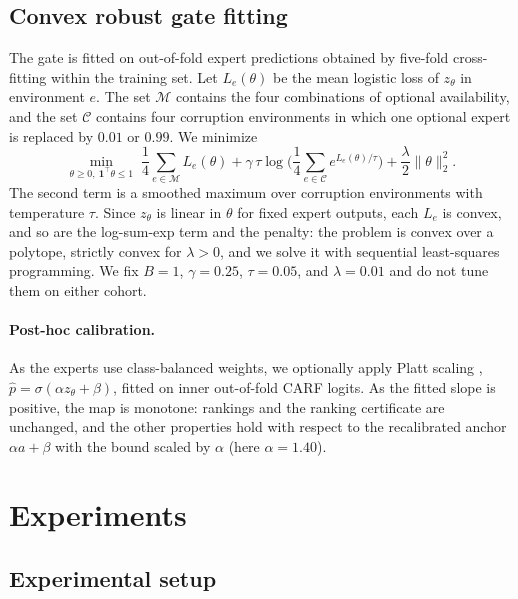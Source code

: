 \documentclass[runningheads]{llncs}
\providecommand{\PlattAlpha}{1.40}
\begin{document}
\subsection{Convex robust gate fitting}

The gate is fitted on out-of-fold expert predictions obtained by five-fold cross-fitting within the training set. Let $L_e(\theta)$ be the mean logistic loss of $z_\theta$ in environment $e$. The set $\mathcal M$ contains the four combinations of optional availability, and the set $\mathcal C$ contains four corruption environments in which one optional expert is replaced by $0.01$ or $0.99$. We minimize
\begin{equation}
 \min_{\theta\ge0,\ \mathbf 1^\top\theta\le1}\;
 \frac14\sum_{e\in\mathcal M}L_e(\theta)
 +\gamma\,\tau\log\Big(\frac14\sum_{e\in\mathcal C}e^{L_e(\theta)/\tau}\Big)
 +\frac\lambda2\|\theta\|_2^2 .
 \label{eq:objective}
\end{equation}
The second term is a smoothed maximum over corruption environments with temperature $\tau$. Since $z_\theta$ is linear in $\theta$ for fixed expert outputs, each $L_e$ is convex, and so are the log-sum-exp term and the penalty: the problem is convex over a polytope, strictly convex for $\lambda>0$, and we solve it with sequential least-squares programming. We fix $B=1$, $\gamma=0.25$, $\tau=0.05$, and $\lambda=0.01$ and do not tune them on either cohort.

\paragraph{Post-hoc calibration.} As the experts use class-balanced weights, we optionally apply Platt scaling \cite{platt1999}, $\hat p=\sigma(\alpha z_\theta+\beta)$, fitted on inner out-of-fold CARF logits. As the fitted slope is positive, the map is monotone: rankings and the ranking certificate are unchanged, and the other properties hold with respect to the recalibrated anchor $\alpha a+\beta$ with the bound scaled by $\alpha$ (here $\alpha=\PlattAlpha$).

\section{Experiments}

\subsection{Experimental setup}
\end{document}
